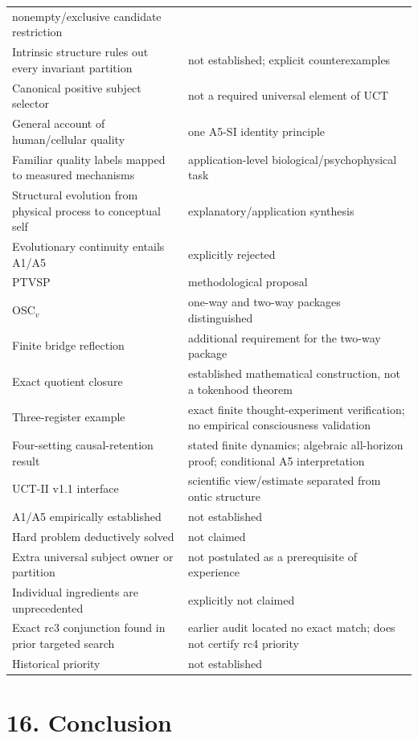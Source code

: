 \documentclass[
  11pt,
  a4paper,
]{article}
\begin{document}
\begin{longtable}[]{@{}
  >{\raggedright\arraybackslash}p{}
  >{\raggedright\arraybackslash}p{}@{}}
nonempty/exclusive candidate restriction \\
Intrinsic structure rules out every invariant partition & not
established; explicit counterexamples \\
Canonical positive subject selector & not a required universal element
of UCT \\
General account of human/cellular quality & one A5-SI identity
principle \\
Familiar quality labels mapped to measured mechanisms &
application-level biological/psychophysical task \\
Structural evolution from physical process to conceptual self &
explanatory/application synthesis \\
Evolutionary continuity entails A1/A5 & explicitly rejected \\
PTVSP & methodological proposal \\
OSC\(_v\) & one-way and two-way packages distinguished \\
Finite bridge reflection & additional requirement for the two-way
package \\
Exact quotient closure & established mathematical construction, not a
tokenhood theorem \\
Three-register example & exact finite thought-experiment verification;
no empirical consciousness validation \\
Four-setting causal-retention result & stated finite dynamics; algebraic
all-horizon proof; conditional A5 interpretation \\
UCT-II v1.1 interface & scientific view/estimate separated from ontic
structure \\
A1/A5 empirically established & not established \\
Hard problem deductively solved & not claimed \\
Extra universal subject owner or partition & not postulated as a
prerequisite of experience \\
Individual ingredients are unprecedented & explicitly not claimed \\
Exact rc3 conjunction found in prior targeted search & earlier audit
located no exact match; does not certify rc4 priority \\
Historical priority & not established \\
\end{longtable}

\hypertarget{conclusion}{%
\section{16. Conclusion}\label{conclusion}}
\end{document}
